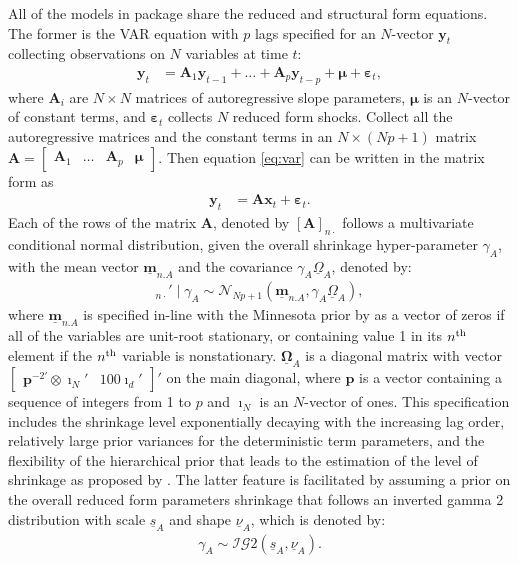 \documentclass[
  nojss]{jss}
\begin{document}
All of the models in package  share the reduced and
structural form equations. The former is the VAR equation with \(p\)
lags specified for an \(N\)-vector \(\mathbf{y}_t\) collecting
observations on \(N\) variables at time \(t\): \begin{align}
\mathbf{y}_t &= \mathbf{A}_1 \mathbf{y}_{t-1} + \dots + \mathbf{A}_p \mathbf{y}_{t-p} + \boldsymbol{\mu} +  \boldsymbol{\varepsilon}_t, \label{eq:var}
\end{align} where \(\mathbf{A}_i\) are \(N\times N\) matrices of
autoregressive slope parameters, \(\boldsymbol{\mu}\) is an \(N\)-vector
of constant terms, and \(\boldsymbol{\varepsilon}_t\) collects \(N\)
reduced form shocks. Collect all the autoregressive matrices and the
constant terms in an \(N\times (Np+1)\) matrix
\(\mathbf{A} = \begin{bmatrix}\mathbf{A}_1& \dots & \mathbf{A}_p & \boldsymbol{\mu}\end{bmatrix}\).
Then equation \eqref{eq:var} can be written in the matrix form as
\begin{align}
\mathbf{y}_t &= \mathbf{A}\mathbf{x}_t + \boldsymbol{\varepsilon}_t. \label{eq:rf}
\end{align} Each of the rows of the matrix \(\mathbf{A}\), denoted by
\([\mathbf{A}]_{n\cdot}\) follows a multivariate conditional normal
distribution, given the overall shrinkage hyper-parameter \(\gamma_A\),
with the mean vector \(\underline{\mathbf{m}}_{n.A}\) and the covariance
\(\gamma_A\underline{\Omega}_A\), denoted by: \begin{align}
[\mathbf{A}]_{n\cdot}'\mid\gamma_A \sim\mathcal{N}_{Np+1}\left( \underline{\mathbf{m}}_{n.A}, \gamma_A\underline{\Omega}_A \right),
\end{align} where \(\underline{\mathbf{m}}_{n.A}\) is specified in-line
with the Minnesota prior by \cite{Doan1984} as a vector of zeros if all
of the variables are unit-root stationary, or containing value 1 in its
\(n\textsuperscript{th}\) element if the \(n\textsuperscript{th}\)
variable is nonstationary. \(\underline{\boldsymbol{\Omega}}_A\) is a
diagonal matrix with vector
\(\begin{bmatrix}\mathbf{p}^{-2\prime}\otimes\boldsymbol{\imath}_N' & 100\boldsymbol{\imath}_d'\end{bmatrix}'\)
on the main diagonal, where \(\mathbf{p}\) is a vector containing a
sequence of integers from 1 to \(p\) and \(\imath_N\) is an \(N\)-vector
of ones. This specification includes the shrinkage level exponentially
decaying with the increasing lag order, relatively large prior variances
for the deterministic term parameters, and the flexibility of the
hierarchical prior that leads to the estimation of the level of
shrinkage as proposed by \cite{Giannone2015}. The latter feature is
facilitated by assuming a prior on the overall reduced form parameters
shrinkage that follows an inverted gamma 2 distribution
\citep[see][Appendix A, for the detailed specification]{Bauwens1999}
with scale \(\underline{s}_A\) and shape \(\underline{\nu}_A\), which is
denoted by: \begin{align}
\gamma_A \sim\mathcal{IG}2\left(\underline{s}_A, \underline{\nu}_A\right).
\end{align}
\end{document}
